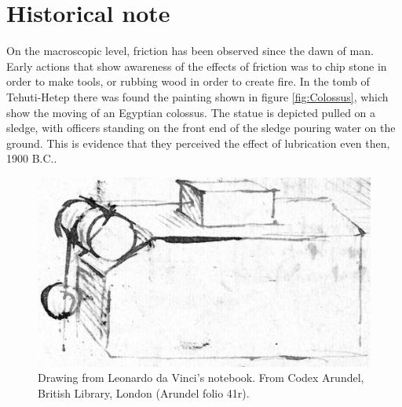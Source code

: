 \documentclass[twoside,english]{uiofysmaster}
\begin{document}
\section{Historical note}
On the macroscopic level, friction has been observed since the dawn of man. 
Early actions that show awareness of the effects of friction was to chip stone in order to make tools, or rubbing wood in order to create fire. 
In the tomb of Tehuti-Hetep there was found the painting shown in figure \ref{fig:Colossus}, which show the moving of an Egyptian colossus. 
The statue is depicted pulled on a sledge, with officers standing on the front end of the sledge pouring water on the ground. 
This is evidence that they perceived the effect of lubrication even then, 1900 B.C..   


\begin{figure}[H]
	\centering
	\includegraphics[width=0.5\linewidth]{figures/friction/LeonardoDaVinciBW}
	\caption{Drawing from Leonardo da Vinci's notebook. From Codex Arundel, British Library, London (Arundel folio 41r).}
	\label{fig:leonardoDaVinci}
\end{figure}
\end{document}
